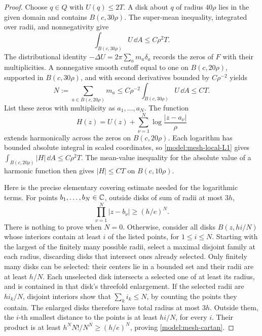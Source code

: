 \begin{proof}
Choose \(q\in Q\) with \(U(q)\le2T\).  A disk about \(q\) of radius
\(40\rho\) lies in the given domain and contains \(B(c,30\rho)\).
The super-mean inequality, integrated over radii, and nonnegativity give
\begin{equation}
 \int_{B(c,30\rho)}U\,\dd A\le C\rho^2T.
 \label{model:mesh-local-L1}
\end{equation}
The distributional identity
\(-\Delta U=2\pi\sum_a m_a\delta_a\) records the zeros of \(F\)
with their multiplicities.  A nonnegative smooth cutoff equal to one
on \(B(c,20\rho)\), supported in \(B(c,30\rho)\), and with second
derivatives bounded by \(C\rho^{-2}\) yields
\[
 N:=\sum_{a\in B(c,20\rho)}m_a
 \le C\rho^{-2}\int_{B(c,30\rho)}U\,\dd A\le CT.
\]
List these zeros with multiplicity as \(a_1,\ldots,a_N\).  The function
\[
 H(z)=U(z)+\sum_{\nu=1}^N
               \log\frac{|z-a_\nu|}{\rho}
\]
extends harmonically across the zeros on \(B(c,20\rho)\).  Each
logarithm has bounded absolute integral in scaled coordinates, so
\eqref{model:mesh-local-L1} gives
\(\int_{B(c,20\rho)}|H|\,\dd A\le C\rho^2T\).
The mean-value inequality for the absolute value of a harmonic function
then gives \(|H|\le CT\) on \(B(c,10\rho)\).

Here is the precise elementary covering estimate needed for the
logarithmic terms.  For points \(b_1,\ldots,b_N\in\mathbb C\), outside disks
of sum of radii at most \(3h\),
\begin{equation}
 \prod_{\nu=1}^N|z-b_\nu|\ge(h/e)^N.
 \label{model:mesh-cartan}
\end{equation}
There is nothing to prove when \(N=0\).  Otherwise, consider all disks
\(B(z,hi/N)\) whose interiors contain at least \(i\) of the listed
points, for \(1\le i\le N\).  Starting with the largest of the finitely
many possible radii, select a maximal disjoint family at each radius,
discarding disks that intersect ones already selected.  Only finitely
many disks can be selected: their centers lie in a bounded set and their
radii are at least \(h/N\).  Each unselected disk intersects a selected
one of at least its radius, and is contained in that disk's threefold
enlargement.  If the selected radii are \(hi_k/N\), disjoint interiors
show that \(\sum_k i_k\le N\), by counting the points they contain.
The enlarged disks therefore have total radius at most \(3h\).
Outside them, the \(i\)-th smallest distance to the points is at least
\(hi/N\), for every \(i\).  Their product is at least
\(h^N N!/N^N\ge(h/e)^N\), proving \eqref{model:mesh-cartan}.


\end{proof}
